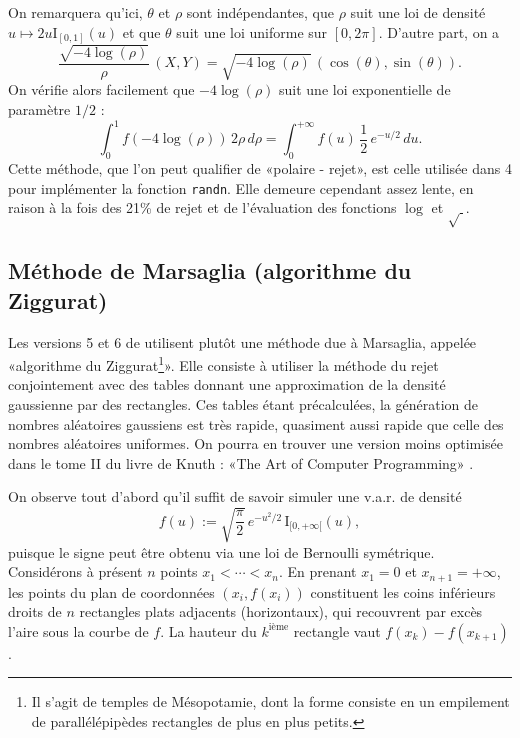 On remarquera qu'ici, $\theta$ et $\rho$ sont indépendantes, que $\rho$ suit une loi de
densité $u\mapsto 2u\mathrm{I}_{[0,1]}(u)$ et que $\theta$ suit une loi uniforme sur
$[0,2\pi]$. D'autre part, on a
$$
\frac{\sqrt{-4\log(\rho)}}{\rho}\,(X,Y) 
= \sqrt{-4\log(\rho)}\,(\cos(\theta),\sin(\theta)).
$$
On vérifie alors facilement que $-4\log(\rho)$ suit une loi exponentielle de
paramètre $1/2$ :
$$
\int_0^1 \!\!\!f(-4\log(\rho))\,2\rho\,d\rho
=
\int_0^{+\infty} \!\!\!f(u)\,\frac{1}{2}\,e^{-u/2}\,du.
$$
Cette méthode, que l'on peut qualifier de «polaire - rejet», est celle
utilisée dans \ML{} 4 pour implémenter la fonction \texttt{randn}.
Elle demeure cependant assez lente, en raison à la fois des 21\% de rejet et de
l'évaluation des fonctions $\log$ et $\sqrt{\ }$.

\subsection{Méthode de Marsaglia (algorithme du Ziggurat)}

Les versions 5 et 6 de \ML{} utilisent plutôt une méthode due à Marsaglia,
appelée «algorithme du Ziggurat\footnote{Il s'agit de temples de Mésopotamie,
  dont la forme consiste en un empilement de parallélépipèdes rectangles de
  plus en plus petits.}».  Elle consiste à utiliser la méthode du rejet
conjointement avec des tables donnant une approximation de la densité
gaussienne par des rectangles.  Ces tables étant précalculées, la génération
de nombres aléatoires gaussiens est très rapide, quasiment aussi rapide que
celle des nombres aléatoires uniformes.  On pourra en trouver une version
moins optimisée dans le tome II du livre de Knuth : «The Art of Computer
Programming» \cite{knuth-taocp-2-3}.

On observe tout d'abord qu'il suffit de savoir simuler une v.a.r.  de
densité
$$
f(u):=\sqrt{\frac{\pi}{2}}\,e^{-u^2/2}\,\mathrm{I}_{[0,+\infty[}(u),
$$
puisque le signe peut être obtenu via une loi de Bernoulli symétrique.
Considérons à présent $n$ points $x_1<\cdots<x_n$.  En prenant $x_1=0$ et
$x_{n+1}=+\infty$, les points du plan de coordonnées $(x_i,f(x_i))$ constituent les
coins inférieurs droits de $n$ rectangles plats adjacents (horizontaux), qui
recouvrent par excès l'aire sous la courbe de $f$.  La hauteur du
$k^\text{ième}$ rectangle vaut $f(x_k)-f(x_{k+1})$.

